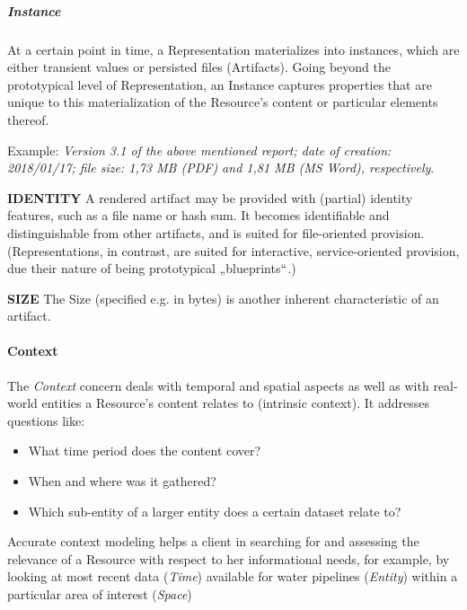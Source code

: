 

\subparagraph*{Instance}
At a certain point in time, a Representation materializes into instances, which are either transient values or persisted files (Artifacts). Going beyond the prototypical level of Representation, an Instance captures properties that are unique to this materialization of the Resource’s content or particular elements thereof. 



Example: \textit{Version 3.1 of the above mentioned report; date of creation: 2018/01/17; file size: 1,73 MB (PDF) and 1,81 MB (MS Word), respectively}.



\textbf{IDENTITY} A rendered artifact may be provided with (partial) identity features, such as a file name or hash sum. It becomes identifiable and distinguishable from other artifacts, and is suited for file-oriented provision. (Representations, in contrast, are suited for interactive, service-oriented provision, due their nature of being prototypical „blueprints$``$.) 

\textbf{SIZE }The Size (specified e.g. in bytes) is another inherent characteristic of an artifact. 



\paragraph{Context\\}
The \textit{Context} concern deals with temporal and spatial aspects as well as with real-world entities a Resource’s content relates to (intrinsic context). It addresses questions like: 
 \begin{itemize}
	\item What time period does the content cover? 
 	\item When and where was it gathered? 
 	\item Which sub-entity of a larger entity does a certain dataset relate to?
\end{itemize} 
Accurate context modeling helps a client in searching for and assessing the relevance of a Resource with respect to her informational needs, for example, by looking at most recent data (\textit{Time}) available for water pipelines (\textit{Entity}) within a particular area of interest (\textit{Space}) 


